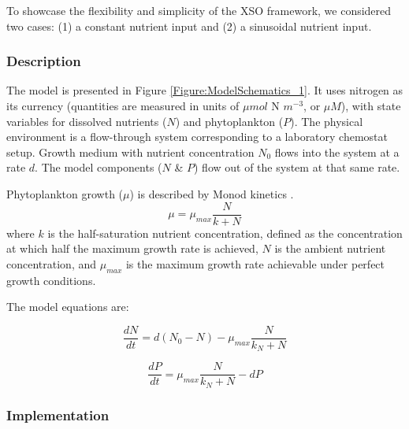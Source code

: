 \documentclass[journal abbreviation, manuscript]{copernicus}
\begin{document}
To showcase the flexibility and simplicity of the XSO framework, we considered two cases: (1) a constant nutrient input and (2) a sinusoidal nutrient input.

\subsubsection{Description}
The model is presented in Figure \ref{Figure:ModelSchematics_1}. It uses nitrogen as its currency (quantities are measured in units of $\mu mol$ N $m^{-3}$, or $\mu M$), with state variables for dissolved nutrients ($N$) and phytoplankton ($P$). The physical environment is a flow-through system corresponding to a laboratory chemostat setup. Growth medium with nutrient concentration $N_0$ flows into the system at a rate $d$. The model components ($N$ \& $P$) flow out of the system at that same rate.

Phytoplankton growth ($\mu$) is described by Monod kinetics \citep{Monod1942RecherchesBacteriennes}.
\begin{equation}
    \mu = \mu_{max} \frac{N}{k + N} 
\end{equation}
where $k$ is the half-saturation nutrient concentration, defined as the concentration at which half the maximum growth rate is achieved, $N$ is the ambient nutrient concentration, and $\mu_{max}$ is the maximum growth rate achievable under perfect growth conditions.

The model equations are:

\begin{equation}
    \frac{d N}{d t} = 
    d (N_0 - N) %
    -  \mu_{max} \frac{N}{k_N + N} 
\end{equation}

\begin{equation}
    \frac{d P}{d t} =
    \mu_{max} \frac{N}{k_N + N} 
    - d P
\end{equation}



\subsubsection{Implementation}
\end{document}

